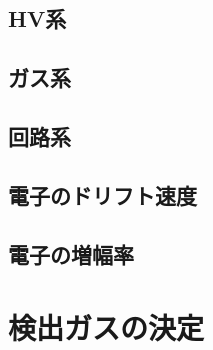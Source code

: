 \subsection{HV系}
\subsection{ガス系}
\subsection{回路系}
\subsection{電子のドリフト速度}
\subsection{電子の増幅率}

\section{検出ガスの決定}


%
%
